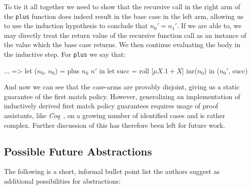 To tie it all together we need to show that the recursive call in the right arm
of the \texttt{plus} function does indeed result in the base case in the left
arm, allowing us to use the induction hypothesis to conclude that $n_0' =
n_1'$. If we are able to, we may directly treat the return value of the
recursive function call as an instance of the value which the base case
returns. We then continue evaluating the body in the inductive step. For
\texttt{plus} we say that:

\begin{rfuncode}
  $\dots$ => let ($n_0$, $n_0$) = plus $n_0$ $n'$
        in let succ = roll [$\mu X . 1 + X$] inr($n_0$)
        in ($n_0'$, succ)
\end{rfuncode}

And now we can see that the case-arms are provably disjoint, giving us a static
guarantee of the first match policy. However, generalizing an implementation
of inductively derived first match policy guarantees requires usage of proof
assistants, like \emph{Coq}~\cite{Bertot:2013}, on a growing number of
identified cases and is rather complex. Further discussion of this has
therefore been left for future work.

%
%
%
%

\subsection{Possible Future Abstractions}

The following is a short, informal bullet point list the authors suggest as
additional possibilities for abstractions:

